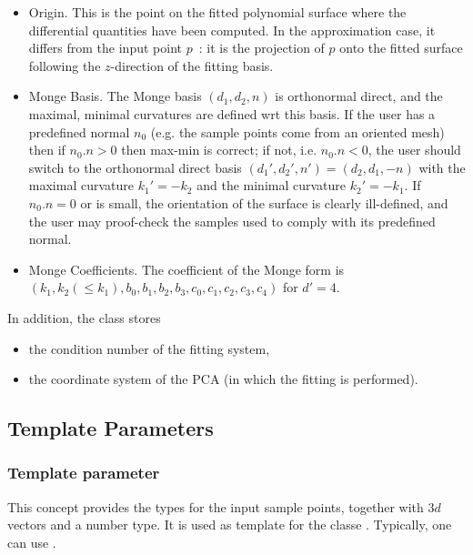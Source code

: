 \begin{itemize}
\item Origin. This is the point on the fitted polynomial surface
where the differential quantities have been computed. In the
approximation case, it differs from the input point $p$~: it is the
projection of $p$ onto the fitted surface following the $z$-direction
of the fitting basis.

\item Monge Basis. The Monge basis $(d_1,d_2,n)$ is orthonormal
direct, and the maximal, minimal curvatures are defined wrt this
basis. If the user has a predefined normal $n_0$ (e.g. the sample
points come from an oriented mesh) then if $n_0 . n >0$ then max-min
is correct; if not, i.e. $n_0 . n <0$, the user should switch to the
orthonormal direct basis $(d_1',d_2',n')=(d_2,d_1,-n)$ with the
maximal curvature $k_1'=-k_2$ and the minimal curvature
$k_2'=-k_1$. If $n_0 . n =0$ or is small, the orientation of the
surface is clearly ill-defined, and the user may proof-check the
samples used to comply with its predefined normal.


\item Monge Coefficients.
The coefficient of the Monge form is $(k_1, k_2 (\leq k_1),
b_0, b_1, b_2, b_3, c_0, c_1, c_2, c_3, c_4)$ for $d' = 4$.

\end{itemize}

In addition, the class  stores 
\begin{itemize}
\item
the condition number of the fitting system,
\item 
the coordinate system of the PCA (in which the fitting is performed).
\end{itemize}

\subsection{Template Parameters}

\subsubsection{Template parameter }

This concept provides the types for the input sample points, together
with $3d$ vectors and a number type. It is used as template for the
classe  . Typically, one can use
.

